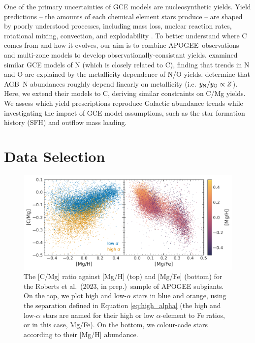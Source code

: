 \documentclass[fleqn,
usenatbib]{mnras}
\newcommand{\citetjack}{Roberts et al.~(2023, in prep.)}
\newcommand{\agb}{AGB}
\newcommand{\apogee}{APOGEE}
\newcommand{\gce}{GCE}
\newcommand{\sfh}{SFH} %
\begin{document}
One of the primary uncertainties of GCE models are nucleosynthetic yields. Yield predictions -- the amounts of each chemical element stars produce --
are shaped by poorly understood processes, including mass loss, nuclear reaction rates, rotational mixing, convection, and explodability \citep{romano+10,KL14,ventura+13, LC18, emily+21}.
To better understand where C comes from and how it evolves, our aim is to combine \apogee\ observations and multi-zone models to develop observationally-consistant yields.
\cite{james+23} examined similar \gce{} models of N (which is closely related to C), finding that trends in N and O are explained by the metallicity dependence of N/O yields. \citet{james+23} determine that \agb\ N abundances roughly depend linearly on metallicity (i.e. $y_{\rm N}/y_{\rm O} \propto Z$). 
Here, we extend their models to C, deriving similar constraints on C/Mg yields. We assess which yield prescriptions reproduce Galactic abundance trends while investigating the impact of \gce{} model assumptions, such as the star formation history (\sfh{}) and outflow mass loading.





\section{Data Selection}


\begin{figure}
    \centering
    \includegraphics{subgiants.pdf}
    \caption{The [C/Mg] ratio against [Mg/H] (top) and [Mg/Fe] (bottom) for the \citetjack~sample of \apogee{} subgiants. On the top, we plot high and low-$\alpha$ stars in blue and orange, using the separation defined in Equation \ref{eq:high_alpha} (the high and low-$\alpha$ stars are named for their high or low $\alpha$-element to Fe ratios, or in this case, Mg/Fe). On the bottom, we colour-code stars according to their [Mg/H] abundance.} \label{fig:subgiants}
\end{figure}
\end{document}

